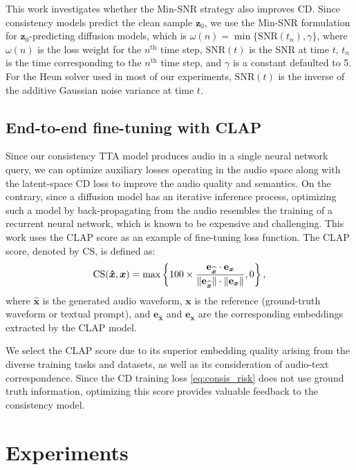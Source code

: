 \documentclass{article}
\newcommand{\sz}{\boldsymbol{z}}
\newcommand{\sx}{\boldsymbol{x}}
\newcommand{\shatx}{\boldsymbol{\hat{x}}}
\newcommand{\EGen}{\mathbf{e}_{\boldsymbol{\widehat{x}}}}
\newcommand{\ERef}{\mathbf{e}_{\sx}}
\begin{document}
This work investigates whether the Min-SNR strategy also improves CD. Since consistency models predict the clean sample $\sz_0$, we use the Min-SNR formulation for $\sz_0$-predicting diffusion models, which is $\omega (n) = \min \{ \mathrm{SNR} (t_n), \gamma \}$, where $\omega (n)$ is the loss weight for the $n^{\text{th}}$ time step, $\mathrm{SNR} (t)$ is the SNR at time $t$, $t_n$ is the time corresponding to the $n^{\text{th}}$ time step, and $\gamma$ is a constant defaulted to 5. For the Heun solver used in most of our experiments, $\mathrm{SNR} (t)$ is the inverse of the additive Gaussian noise variance at time $t$.


\subsection{End-to-end fine-tuning with CLAP} \label{sec:CLAP_finetune}

Since our consistency TTA model produces audio in a single neural network query, we can optimize auxiliary losses operating in the audio space along with the latent-space CD loss to improve the audio quality and semantics. On the contrary, since a diffusion model has an iterative inference process, optimizing such a model by back-propagating from the audio resembles the training of a recurrent neural network, which is known to be expensive and challenging.
This work uses the CLAP score \cite{clap} as an example of fine-tuning loss function. The CLAP score, denoted by $\mathrm{CS}$, is defined as:
\vspace{-1.2mm}
\begin{equation} \label{eq:clapscore}
    \mathrm{CS} (\shatx, \sx) = \max \left\{ 100 \times \frac{\EGen \cdot \ERef} {\| \EGen \| \cdot \| \ERef \|} , 0 \right\}, \\[-.5mm]
\end{equation}
where $\shatx$ is the generated audio waveform, $\sx$ is the reference (ground-truth waveform or textual prompt), and $\EGen$ and $\ERef$ are the corresponding embeddings extracted by the CLAP model.

We select the CLAP score due to its superior embedding quality arising from the diverse training tasks and datasets, as well as its consideration of audio-text correspondence. Since the CD training loss \cref{eq:consis_risk} does not use ground truth information, optimizing this score provides valuable feedback to the consistency model.



\section{Experiments} \label{sec:experiments}
\end{document}
